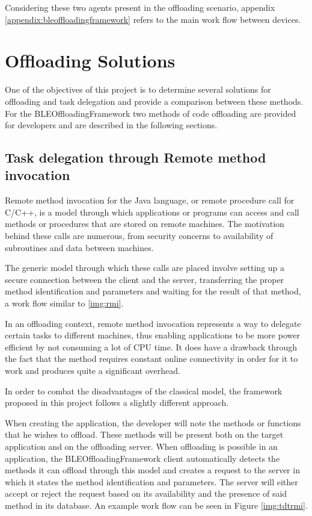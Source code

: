 	Considering these two agents present in the offloading scenario, appendix \ref{appendix:bleoffloadingframework} refers to the main work flow between devices.
	
\section{Offloading Solutions}
\label{offloadingsolutions}

	One of the objectives of this project is to determine several solutions for offloading and task delegation and provide a comparison between these methods. For the BLEOffloadingFramework two methods of code offloading are provided for developers and are described in the following sections.

\subsection{Task delegation through Remote method invocation}
\label{section:taskdelegation}

	Remote method invocation \cite{downing1998java} for the Java language, or remote procedure call for C/C++, is a model through which applications or programs can access and call methods or procedures that are stored on remote machines. The motivation behind these calls are numerous, from security concerns to availability of subroutines and data between machines.
	
	The generic model through which these calls are placed involve setting up a secure connection between the client and the server, transferring the proper method identification and parameters and waiting for the result of that method, a work flow similar to \ref{img:rmi}.
	

	In an offloading context, remote method invocation represents a way to delegate certain tasks to different machines, thus enabling applications to be more power efficient by not consuming a lot of CPU time. It does have a drawback through the fact that the method requires constant online connectivity in order for it to work and produces quite a significant overhead.
	
	In order to combat the disadvantages of the classical model, the framework proposed in this project follows a slightly different approach.
	
	When creating the application, the developer will note the methods or functions that he wishes to offload. These methods will be present both on the target application and on the offloading server. When offloading is possible in an application, the BLEOffloadingFramework client automatically detects the methods it can offload through this model and creates a request to the server in which it states the method identification and parameters. The server will either accept or reject the request based on its availability and the presence of said method in its database. An example work flow can be seen in Figure \ref{img:tdtrmi}.
	
